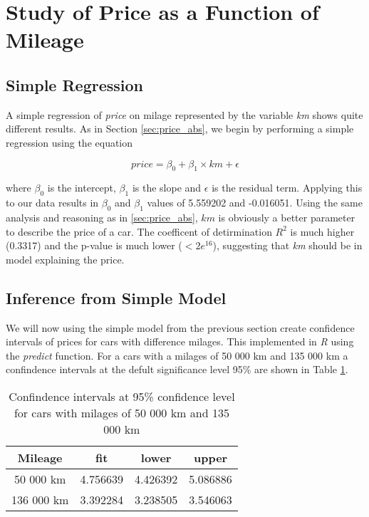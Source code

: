 \section{Study of Price as a Function of Mileage} %
\label{sec:price_km}

\subsection{Simple Regression} %
\label{sub:simple_regression}

A simple regression of \textit{price} on milage represented by the variable \textit{km} shows quite different results. As in Section \ref{sec:price_abs}, we begin by performing a simple regression using the equation

\begin{equation}\label{eq:price_km}
	price = \beta_0 + \beta_1 \times km + \epsilon
\end{equation}

\noindent
where $\beta_0$ is the intercept, $\beta_1$ is the slope and $\epsilon$ is the residual term. Applying this to our data results in $\beta_0$ and $\beta_1$ values of 5.559202 and -0.016051. Using the same analysis and reasoning as in \ref{sec:price_abs}, $km$ is obviously a better parameter to describe the price of a car. The coefficent of detirmination $R^2$ is much higher (0.3317) and the p-value is much lower ($<2e^{16}$), suggesting that \textit{km} should be in model explaining the price.

\subsection{Inference from Simple Model} %
\label{sub:inference_from_simple_model}

We will now using the simple model from the previous section create confidence intervals of prices for cars with difference milages. This implemented in \textit{R} using the \textit{predict} function. For a cars with a milages of 50 000 km and 135 000 km a confindence intervals at the defult significance level 95\% are shown in Table \ref{tab:confint_km}.

\begin{table}[H]
\centering
\begin{tabular}{||c |c c c||} 
 \hline
 Mileage & fit & lower & upper \\ [0.5ex]
 \hline
 50 000 km & 4.756639 & 4.426392 & 5.086886 \\ 
 136 000 km & 3.392284 & 3.238505 & 3.546063 \\
 \hline
\end{tabular}
\caption{Confindence intervals at 95\% confidence level for cars with milages of 50 000 km and 135 000 km}
\label{tab:confint_km}
\end{table}

